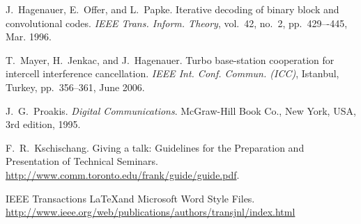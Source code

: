 \documentclass[journal, a4paper]{IEEEtran}
\begin{document}
\begin{thebibliography}{5}

	J.~Hagenauer, E.~Offer, and L.~Papke. Iterative decoding of binary block
	and convolutional codes. {\em IEEE Trans. Inform. Theory},
	vol.~42, no.~2, pp.~429–-445, Mar. 1996.

	T.~Mayer, H.~Jenkac, and J.~Hagenauer. Turbo base-station cooperation for intercell interference cancellation. {\em IEEE Int. Conf. Commun. (ICC)}, Istanbul, Turkey, pp.~356--361, June 2006.

	J.~G.~Proakis. {\em Digital Communications}. McGraw-Hill Book Co.,
	New York, USA, 3rd edition, 1995.

	F.~R.~Kschischang. Giving a talk: Guidelines for the Preparation and Presentation of Technical Seminars.
	\url{http://www.comm.toronto.edu/frank/guide/guide.pdf}.

	IEEE Transactions \LaTeX and Microsoft Word Style Files.
	\url{http://www.ieee.org/web/publications/authors/transjnl/index.html}

\end{thebibliography}

\end{document}
